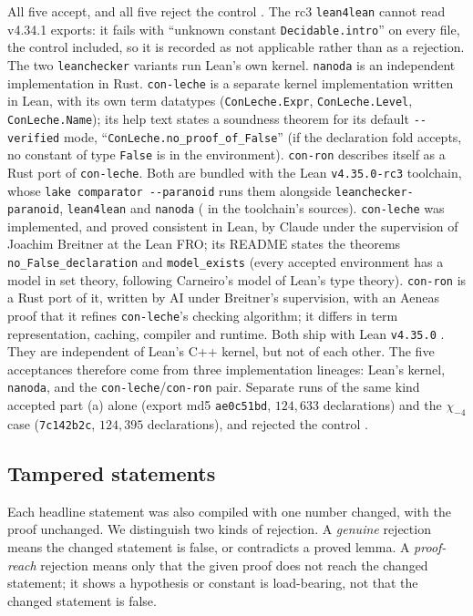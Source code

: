 \documentclass[11pt]{article}
\theoremstyle{definition}
\newcommand{\lean}[1]{\texttt{#1}}
\begin{document}
\noindent
All five accept, and all five reject the control \cite[ADD1 \S4]{bbrecords}. The rc3 \lean{lean4lean} cannot read v4.34.1 exports: it fails with ``unknown constant \lean{Decidable.intro}'' on every file, the control included, so it is recorded as not applicable rather than as a rejection. The two \lean{leanchecker} variants run Lean's own kernel. \lean{nanoda} is an independent implementation in Rust. \lean{con-leche} is a separate kernel implementation written in Lean, with its own term datatypes (\lean{ConLeche.Expr}, \lean{ConLeche.Level}, \lean{ConLeche.Name}); its help text states a soundness theorem for its default \lean{-{}-verified} mode, ``\lean{ConLeche.no\_\allowbreak{}proof\_\allowbreak{}of\_\allowbreak{}False}'' (if the declaration fold accepts, no constant of type \lean{False} is in the environment). \lean{con-ron} describes itself as a Rust port of \lean{con-leche}. Both are bundled with the Lean \lean{v4.35.0-rc3} toolchain, whose \lean{lake comparator -{}-paranoid} runs them alongside \lean{leanchecker-paranoid}, \lean{lean4lean} and \lean{nanoda} ( in the toolchain's sources). \lean{con-leche} \cite{conleche} was implemented, and proved consistent in Lean, by Claude under the supervision of Joachim Breitner at the Lean FRO; its README states the theorems \lean{no\_False\_declaration} and \lean{model\_exists} (every accepted environment has a model in set theory, following Carneiro's model of Lean's type theory). \lean{con-ron} \cite{conron} is a Rust port of it, written by AI under Breitner's supervision, with an Aeneas proof that it refines \lean{con-leche}'s checking algorithm; it differs in term representation, caching, compiler and runtime. Both ship with Lean \lean{v4.35.0} \cite{deMoura2026}. They are independent of Lean's C++ kernel, but not of each other. The five acceptances therefore come from three implementation lineages: Lean's kernel, \lean{nanoda}, and the \lean{con-leche}/\lean{con-ron} pair. Separate runs of the same kind accepted part (a) alone (export md5 \lean{ae0c51bd}, $124{,}633$ declarations) and the $\chi_{-4}$ case (\lean{7c142b2c}, $124{,}395$ declarations), and rejected the control \cite[REVIEW\_GAUSS\_SIGN\_AND\_OAI \S B.6; REPORT\_OAI\_PORT (a)]{bbrecords}.

\subsection{Tampered statements}

Each headline statement was also compiled with one number changed, with the proof unchanged. We distinguish two kinds of rejection. A \emph{genuine} rejection means the changed statement is false, or contradicts a proved lemma. A \emph{proof-reach} rejection means only that the given proof does not reach the changed statement; it shows a hypothesis or constant is load-bearing, not that the changed statement is false.
\end{document}
